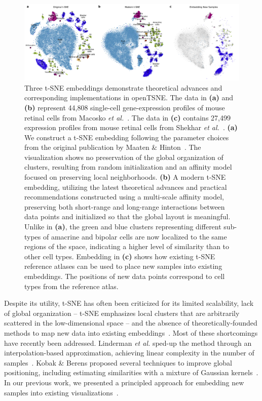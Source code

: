 \documentclass[twocolumn]{bmcart}
\newcommand{\opentsne}{\textsf{openTSNE}}
\begin{document}
\begin{figure}[htbp]
  \includegraphics[width=\textwidth]{macosko2015}
\caption{\label{fig:macosko}
Three t-SNE embeddings demonstrate theoretical advances and corresponding implementations in
\opentsne. The data in \textbf{(a)} and \textbf{(b)} represent 44,808
single-cell gene-expression profiles of mouse retinal cells from Macosko
\textit{et al.}~\cite{macosko2015highly}. The data in \textbf{(c)}
contains 27,499 expression profiles from mouse
retinal cells from Shekhar \textit{et
al.}~\cite{shekhar2016comprehensive}. \textbf{(a)} We construct a t-SNE
embedding following the parameter choices from the original publication
by Maaten \& Hinton~\cite{maaten2008visualizing}. The visualization
shows no preservation of the global organization of clusters,
resulting from random initialization and an affinity model focused on
preserving local neighborhoods. \textbf{(b)} A modern t-SNE
embedding, utilizing the latest theoretical advances and practical
recommendations constructed using a multi-scale
affinity model, preserving both short-range and long-range interactions
between data points and initialized so that the global layout is
meaningful. Unlike in \textbf{(a)}, the green and blue clusters
representing different sub-types of amacrine and bipolar cells are now
localized to the same regions of the space, indicating a higher level
of similarity than to other cell types. Embedding in \textbf{(c)} shows how existing
t-SNE reference atlases can be used to place new samples into existing
embeddings. The positions of new data points correspond to cell types
from the reference atlas.
}
\end{figure}

Despite its utility, t-SNE has often been criticized for its limited
scalability, lack of global organization -- t-SNE emphasizes local clusters that
are arbitrarily scattered in the low-dimensional space -- and the absence of
theoretically-founded methods to map new data into existing
embeddings~\cite{ding2018interpretable,becht2019dimensionality}. Most of these
shortcomings have recently been addressed. Linderman \textit{et al.} sped-up the
method through an interpolation-based approximation, achieving linear complexity
in the number of samples~\cite{linderman2019fast}. Kobak \& Berens proposed
several techniques to improve global positioning, including estimating
similarities with a mixture of Gaussian kernels~\cite{kobak2019art}. In our
previous work, we presented a principled approach for embedding new samples into
existing visualizations~\cite{policar2019embedding}.
\end{document}
